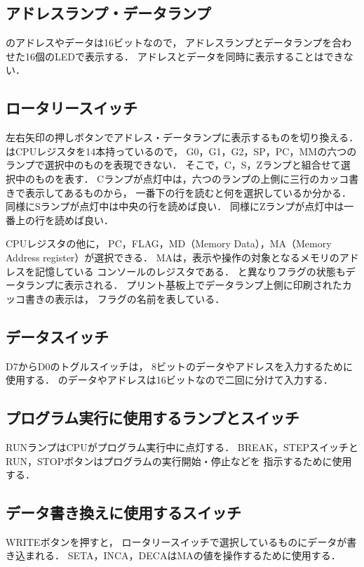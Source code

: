 
\subsection{アドレスランプ・データランプ}
{\tac}のアドレスやデータは16ビットなので，
アドレスランプとデータランプを合わせた16個のLEDで表示する．
アドレスとデータを同時に表示することはできない．

\subsection{ロータリースイッチ}
\label{rotarySW}
左右矢印の押しボタンでアドレス・データランプに表示するものを切り換える．
{\tac}はCPUレジスタを14本持っているので，
G0，G1，G2，SP，PC，MMの六つのランプで選択中のものを表現できない．
そこで，C，S，Zランプと組合せて選択中のものを表す．
Cランプが点灯中は，六つのランプの上側に三行のカッコ書きで表示してあるものから，
一番下の行を読むと何を選択しているか分かる．
同様にSランプが点灯中は中央の行を読めば良い．
同様にZランプが点灯中は一番上の行を読めば良い．

CPUレジスタの他に，
PC，FLAG，MD（Memory Data），MA（Memory Address register）が選択できる．
MAは，表示や操作の対象となるメモリのアドレスを記憶している
コンソールのレジスタである．
{\tec}と異なりフラグの状態もデータランプに表示される．
プリント基板上でデータランプ上側に印刷されたカッコ書きの表示は，
フラグの名前を表している．

\subsection{データスイッチ}
D7からD0のトグルスイッチは，
8ビットのデータやアドレスを入力するために使用する．
{\tac}のデータやアドレスは16ビットなので二回に分けて入力する．

\subsection{プログラム実行に使用するランプとスイッチ}
RUNランプはCPUがプログラム実行中に点灯する．
BREAK，STEPスイッチとRUN，STOPボタンはプログラムの実行開始・停止などを
指示するために使用する．

\subsection{データ書き換えに使用するスイッチ}
WRITEボタンを押すと，
ロータリースイッチで選択しているものにデータが書き込まれる．
SETA，INCA，DECAはMAの値を操作するために使用する．

